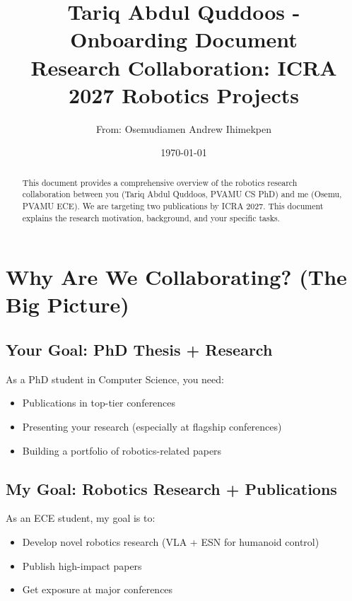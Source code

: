 \documentclass[11pt]{article}
\begin{document}
\title{\textbf{Tariq Abdul Quddoos - Onboarding Document} \\
\textbf{Research Collaboration: ICRA 2027 Robotics Projects}}

\author{From: Osemudiamen Andrew Ihimekpen}
\date{\today}

\maketitle

\begin{abstract}
This document provides a comprehensive overview of the robotics research collaboration between you (Tariq Abdul Quddoos, PVAMU CS PhD) and me (Osemu, PVAMU ECE). We are targeting two publications by ICRA 2027. This document explains the research motivation, background, and your specific tasks.
\end{abstract}

\section{Why Are We Collaborating? (The Big Picture)}

\subsection{Your Goal: PhD Thesis + Research}
As a PhD student in Computer Science, you need:
\begin{itemize}
    \item Publications in top-tier conferences
    \item Presenting your research (especially at flagship conferences)
    \item Building a portfolio of robotics-related papers
\end{itemize}

\subsection{My Goal: Robotics Research + Publications}
As an ECE student, my goal is to:
\begin{itemize}
    \item Develop novel robotics research (VLA + ESN for humanoid control)
    \item Publish high-impact papers
    \item Get exposure at major conferences
\end{itemize}
\end{document}
